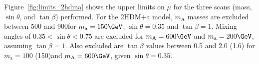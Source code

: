 

Figure~\ref{fig:limits_2hdma} shows the upper limits on $\mu$ for the three scans (mass, $\sin\theta$, and $\tan\beta$) performed.
For the 2HDM+a model, $m_\text{A}$ masses are excluded between 500 and 900\GeV for $m_\text{a}=150\GeV$, $\sin\theta=0.35$ and $\tan\beta=1$. Mixing angles of $0.35<\sin\theta<0.75$ are excluded for $m_\text{A}=600\GeV$ and $m_\text{a}=200\GeV$, assuming $\tan\beta=1$. Also excluded are $\tan\beta$ values between 0.5 and 2.0 (1.6) for $m_\text{a}=100$ (150)\GeV and $m_\text{A}=600\GeV$, given $\sin\theta=0.35$. 

